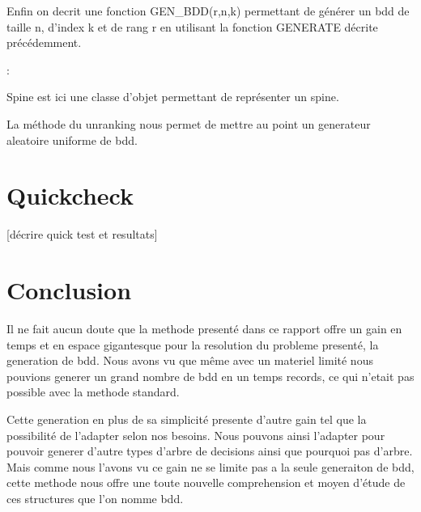 \documentclass[french]{article}
\begin{document}
\newpage

Enfin on decrit une fonction GEN\_BDD(r,n,k) permettant de générer un bdd de taille n, d'index k et de rang r en utilisant la fonction GENERATE décrite précédemment.

\begin{algorithm}
  \begin{algorithmic}[1]
    \Statex
            \State {}
            \State {}
            \State {}
            \State {}
            \State {}
                \State {}
                :
                    \State {}
                    \State {}
                    \State {}
            \EndFor
  \end{algorithmic}
\end{algorithm}

Spine est ici une classe d'objet permettant de représenter un spine.

La méthode du unranking nous permet de mettre au point un generateur aleatoire uniforme de bdd.

\newpage
\section{Quickcheck}
[décrire quick test et resultats]
\newpage
\section{Conclusion}
Il ne fait aucun doute que la methode presenté dans ce rapport offre un gain en temps et en espace gigantesque pour la resolution du probleme presenté, la generation de bdd. Nous avons vu que même avec un materiel limité nous pouvions generer un grand nombre de bdd en un temps records, ce qui n'etait pas possible avec la methode standard. 

Cette generation en plus de sa simplicité presente d'autre gain tel que la possibilité de l'adapter selon nos besoins. Nous pouvons ainsi l'adapter pour pouvoir generer d'autre types d'arbre de decisions ainsi que pourquoi pas d'arbre. 
Mais comme nous l'avons vu ce gain ne se limite pas a la seule generaiton de bdd, cette methode nous offre une toute nouvelle comprehension et moyen d'étude de ces structures que l'on nomme bdd.
\end{document}
